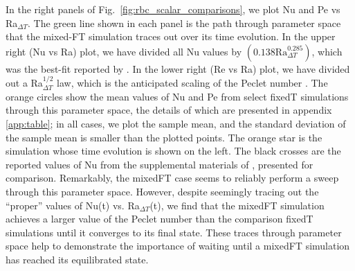 \documentclass[aps, pre, onecolumn, nofootinbib, notitlepage, groupedaddress, amsfonts, amssymb, amsmath, longbibliography]{revtex4-1}
\begin{document}
In the right panels of Fig.~\ref{fig:rbc_scalar_comparisons}, we plot Nu and Pe vs Ra$_{\Delta T}$.
The green line shown in each panel is the path through parameter space that the mixed-FT simulation traces out over its time evolution.
In the upper right (Nu vs Ra) plot, we have divided all Nu values by $(0.138 \text{Ra}_{\Delta T}^{0.285})$, which was the best-fit reported by \cite{johnston&doering2009}.
In the lower right (Re vs Ra) plot, we have divided out a Ra$_{\Delta T}^{1/2}$ law, which is the anticipated scaling of the Peclet number \cite{ahlers&all2009}.
The orange circles show the mean values of Nu and Pe from select fixedT simulations through this parameter space, the details of which are presented in appendix \ref{app:table}; in all cases, we plot the sample mean, and the standard deviation of the sample mean is smaller than the plotted points.
The orange star is the simulation whose time evolution is shown on the left.
The black crosses are the reported values of Nu from the supplemental materials of \cite{zhu&all2018}, presented for comparison.
Remarkably, the mixedFT case seems to reliably perform a sweep through this parameter space.
However, despite seemingly tracing out the ``proper'' values of Nu(t) vs. Ra$_{\Delta T}$(t), we find that the mixedFT simulation achieves a larger value of the Peclet number than the comparison fixedT simulations until it converges to its final state.
These traces through parameter space help to demonstrate the importance of waiting until a mixedFT simulation has reached its equilibrated state.
\end{document}
